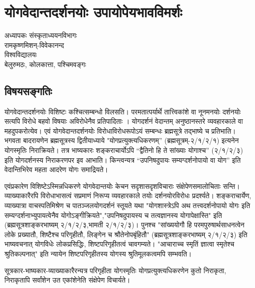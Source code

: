 {\fontsize{15}{17}\selectfont
\chapter{योगवेदान्तदर्शनयोः  उपायोपेयभावविमर्शः}

\begin{center}
\smallskip

अध्यापकः संस्कृताध्ययनविभागः\\
रामकृष्णमिशन्-विवेकानन्द\\
विश्वविद्यालयः\\
बेलुरुमठः, कोलकात्ता, पश्चिमवङ्गः
\addrule
\end{center}

\section*{विषयसङ्गतिः}

योगवेदान्तदर्शनयोः विशिष्टः कश्चित्सम्बन्धो विलसति। परमतात्पर्यार्थे तात्त्विकांशे वा नूनमनयोः दर्शनयोः सत्यपि विरोधे बहवो विषयाः अविरोधेनैव प्रतिपादिताः । योगदर्शनं वेदान्तम् अनुष्ठानस्तरे व्यवहारकाले वा महदुपकरोत्येव। एवं योगवेदान्तदर्शनयोः विरोधाविरोधरूपोऽयं सम्बन्धः ब्रह्मसूत्रे तद्भाष्ये च प्रतिभाति। भगवता बादरायणेन ब्रह्मसूत्रस्य द्वितीयाध्याये "योगप्रत्युक्त्यधिकरणम्” (ब्रह्मसूत्रम्-२/१/२/१) इत्यनेन योगस्मृतिः निराक्रियते। तत्र भाष्यकारः शङ्कराचार्योऽपि “द्वैतिनो हि ते सांख्याः योगाश्च” (२/१/२/३) इति योगदर्शनस्य निराकरणपर इव आभाति। किन्त्वन्यत्र “उपनिषदुपायः सम्यग्दर्शनोपायो वा योग” इति वेदान्तिभिरेव महता आदरेण योगः समाद्रियते।

एवंप्रकारेण विशिष्टेऽस्मिन्नधिकरणे योगवेदान्तयोः केचन सदृशासदृशविचाराः संक्षेपेणसमालोचिताः सन्ति। व्याख्याकारैरपि विरोधाभासत्वं सप्रमाणं निरूप्य व्यवहारकाले तयोः दर्शनयोरविरोधः प्रदर्श्यते। शङ्कराचार्येण, व्याख्यात्रा वाचस्पतिमिश्रेण च पातञ्जलयोगदर्शनं स्तूयते यथा "योगशास्त्रेऽपि अथ तत्त्वदर्शनोपायो योगः इति सम्यग्दर्शनाभ्युपायत्वेनैव योगोऽङ्गीक्रियते","उपनिषदुपायस्य च तत्वज्ञानस्य योगापेक्षास्ति" इति (ब्रह्मसूत्रशाङ्करभाष्यम् २/१/२/३,भामती २/१/२/३)। पुनश्च "सांख्ययोगौ हि परमपुरुषार्थसाधनत्वेन लोके प्रख्यातौ, शिष्टैश्च परिगृहीतौ, लिङ्गेन च श्रौतेनोपबृंहितौ" (ब्रह्मसूत्रशाङ्करभाष्यम् २/१/२/३) इति भाष्यवचनात् योगविधेः लोकप्रसिद्धिः, शिष्टपरिगृहीतत्वं चावगम्यते। "आचाराच्च स्मृतिं ज्ञात्वा स्मृतेश्च श्रुतिकल्पनात्" इति न्यायेन शिष्टपरिगृहीतस्य योगस्य श्रुतिमूलकत्वमपि सम्भवति।

सूत्रकार-भाष्यकार-व्याख्याकारैरन्यत्र परिगृहीता योगस्मृतिः योगप्रत्युक्त्यधिकरणेन कुतो निराकृता, निराकृतापि सर्वांशेन उत एकांशेनेति संक्षेपेण विचार्यते।

}
